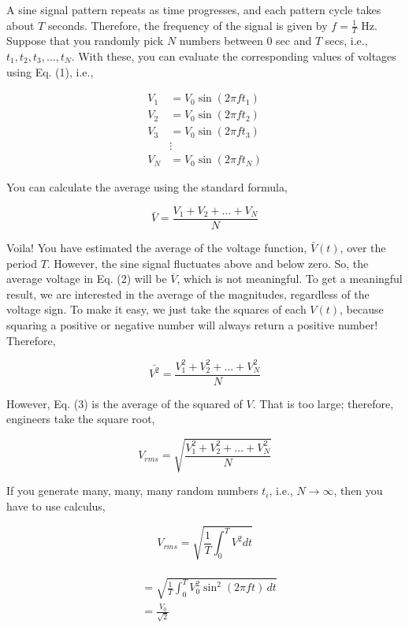\documentclass[twocolumn,a4paper,11pt]{article}
\begin{document}
A sine signal pattern repeats as time progresses, and each pattern cycle takes about \(T\) seconds. Therefore, the frequency of the signal is given by \( f = \frac{1}{T} \) Hz. Suppose that you randomly pick \( N \) numbers between 0 sec and \(T\) secs, i.e., \( t_1, t_2, t_3, \ldots, t_N \). With these, you can evaluate the corresponding values of voltages using Eq. (1), i.e.,

\[
\begin{aligned}
    V_1 &= V_0 \sin(2\pi ft_1) \\
    V_2 &= V_0 \sin(2\pi ft_2) \\
    V_3 &= V_0 \sin(2\pi ft_3) \\
    &\vdots \\
    V_N &= V_0 \sin(2\pi ft_N)
\end{aligned}
\]

You can calculate the average using the standard formula,

\begin{equation}
    \bar{V} = \frac{V_1 + V_2 + \ldots + V_N}{N}
\end{equation}

Voila! You have estimated the average of the voltage function, \( \bar{V}(t) \), over the period \( T \). However, the sine signal fluctuates above and below zero. So, the average voltage in Eq. (2) will be \( \overline{V} \), which is not meaningful. To get a meaningful result, we are interested in the average of the magnitudes, regardless of the voltage sign. To make it easy, we just take the squares of each \(V(t)\), because squaring a positive or negative number will always return a positive number! Therefore,

\begin{equation}
    \bar{V^2} = \frac{V_1^2 + V_2^2 + \ldots + V_N^2}{N}
\end{equation}

However, Eq. (3) is the average of the squared of \(V\). That is too large; therefore, engineers take the square root,

\begin{equation}
    V_{rms} = \sqrt{\frac{V_1^2 + V_2^2 + \ldots + V_N^2}{N}}
\end{equation}

If you generate many, many, many random numbers \( t_i \), i.e., \( N \rightarrow \infty \), then you have to use calculus,

\begin{equation}
    V_{rms} = \sqrt{\frac{1}{T} \int_{0}^{T} V^2 dt} 
\end{equation}   
\\
\newpage
\begin{align*}
     &= \sqrt{\frac{1}{T} \int_{0}^{T} V_0^2 \sin^2(2\pi ft) \, dt} \\
     &= \frac{V_0}{\sqrt{2}} 
\end{align*}   
\end{document}
